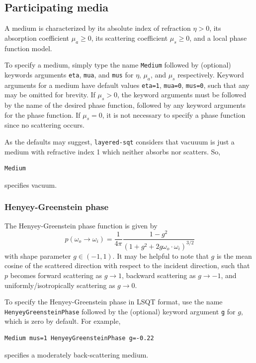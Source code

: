 \documentclass[
    twoside,
    twocolumn,
    letterpaper,
    10pt]{article}
\newcommand\namett[2]{{\color{code#1}\texttt{#2}}}
\begin{document}
\subsection{Participating media}
\label{sec:doc-media}

A medium is characterized by its 
absolute index of refraction $\eta > 0$, its absorption coefficient 
$\mu_a \ge 0 $, its scattering coefficient $\mu_s \ge 0$, and a local
phase function model.

To specify a medium, simply type the name \namett{blue}{Medium} followed
by (optional) keywords arguments \texttt{eta}, \texttt{mua}, and
\texttt{mus} for $\eta$, $\mu_a$, and $\mu_s$ respectively. Keyword 
arguments for a medium have default values \texttt{eta=1}, \texttt{mua=0}, 
\texttt{mus=0}, such that any may be omitted for brevity.
If $\mu_s > 0$, the keyword arguments must be followed by the name 
of the desired phase function, followed by any keyword arguments for the 
phase function. If $\mu_s = 0$, it is not necessary to specify a phase function
since no scattering occurs.

As the defaults may suggest, \texttt{layered-sqt} considers that vacuuum 
is just a medium with refractive index 1 which neither absorbs nor scatters. 
So,
\begin{lstlisting}
Medium
\end{lstlisting}
specifies vacuum. 

\subsubsection{Henyey-Greenstein phase}
\label{sec:doc-media-henyey-greenstein}

The Henyey-Greenstein phase function is given by 
\begin{equation*}
    p(\omega_o\to\omega_i) = 
    \frac{1}{4\pi}
    \frac{1-g^2}{(1+g^2+2g\omega_o\cdot\omega_i)^{3/2}}
\end{equation*}
with shape parameter $g\in(-1,1)$. It may be helpful to note 
that $g$ is the mean cosine of the scattered direction with respect to the 
incident direction, such that $p$ becomes forward scattering as $g\to1$, 
backward scattering as $g\to-1$, and uniformly/isotropically scattering 
as $g\to0$.

To specify the Henyey-Greenstein phase in LSQT format, use the name
\namett{purple}{HenyeyGreensteinPhase} followed by the (optional) keyword 
argument \texttt{g} for $g$, which is zero by default. For example,
\begin{lstlisting}
Medium mus=1 HenyeyGreensteinPhase g=-0.22
\end{lstlisting}
specifies a moderately back-scattering medium.
\end{document}

